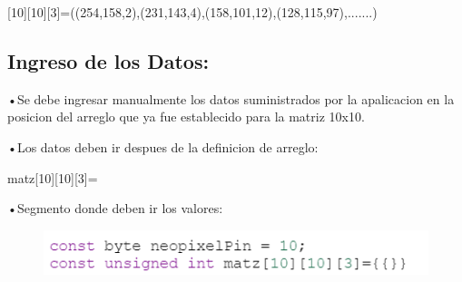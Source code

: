 \documentclass{article}
\begin{document}
[10][10][3]=((254,158,2),(231,143,4),(158,101,12),(128,115,97),.......)


\subsection{Ingreso de los Datos:}

•Se debe ingresar manualmente los datos suministrados por la apalicacion en la posicion del arreglo que ya fue establecido para la matriz 10x10.

•Los datos deben ir despues de la definicion de arreglo:

\vspace{0.2cm}
    matz[10][10][3]=

\vspace{0.2cm}
•Segmento donde deben ir los valores:

\begin{figure}[h]
\includegraphics[width=12cm]{det.PNG}
\centering
\caption{}
\label{fig:tipos}
\end{figure}
\end{document}
